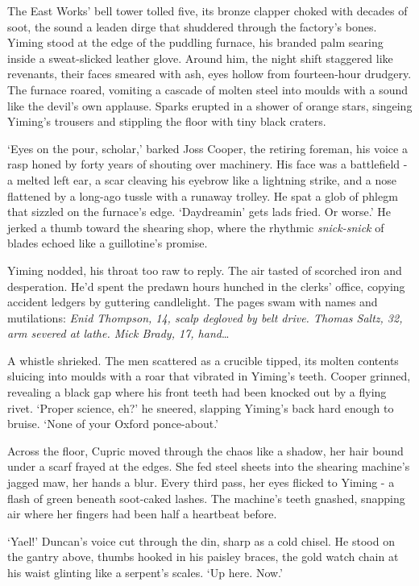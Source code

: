 The East Works' bell tower tolled five, its bronze clapper choked with decades of soot, the sound a leaden dirge that shuddered through the factory's bones. Yiming stood at the edge of the puddling furnace, his branded palm searing inside a sweat-slicked leather glove. Around him, the night shift staggered like revenants, their faces smeared with ash, eyes hollow from fourteen-hour drudgery. The furnace roared, vomiting a cascade of molten steel into moulds with a sound like the devil's own applause. Sparks erupted in a shower of orange stars, singeing Yiming's trousers and stippling the floor with tiny black craters.

`Eyes on the pour, scholar,' barked Joss Cooper, the retiring foreman, his voice a rasp honed by forty years of shouting over machinery. His face was a battlefield - a melted left ear, a scar cleaving his eyebrow like a lightning strike, and a nose flattened by a long-ago tussle with a runaway trolley. He spat a glob of phlegm that sizzled on the furnace's edge. `Daydreamin' gets lads fried. Or worse.' He jerked a thumb toward the shearing shop, where the rhythmic \textit{snick-snick} of blades echoed like a guillotine's promise.

Yiming nodded, his throat too raw to reply. The air tasted of scorched iron and desperation. He'd spent the predawn hours hunched in the clerks' office, copying accident ledgers by guttering candlelight. The pages swam with names and mutilations: \textit{Enid Thompson, 14, scalp degloved by belt drive. Thomas Saltz, 32, arm severed at lathe. Mick Brady, 17, hand}\dots

A whistle shrieked. The men scattered as a crucible tipped, its molten contents sluicing into moulds with a roar that vibrated in Yiming's teeth. Cooper grinned, revealing a black gap where his front teeth had been knocked out by a flying rivet. `Proper science, eh?' he sneered, slapping Yiming's back hard enough to bruise. `None of your Oxford ponce-about.'

Across the floor, Cupric moved through the chaos like a shadow, her hair bound under a scarf frayed at the edges. She fed steel sheets into the shearing machine's jagged maw, her hands a blur. Every third pass, her eyes flicked to Yiming - a flash of green beneath soot-caked lashes. The machine's teeth gnashed, snapping air where her fingers had been half a heartbeat before.

`Yael!' Duncan's voice cut through the din, sharp as a cold chisel. He stood on the gantry above, thumbs hooked in his paisley braces, the gold watch chain at his waist glinting like a serpent's scales. `Up here. Now.'

